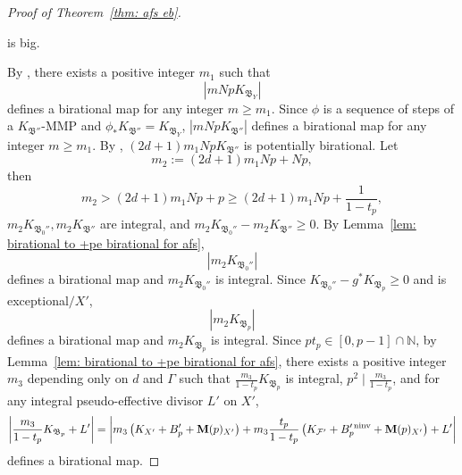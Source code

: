 \documentclass[11pt,reqno]{amsart}
\numberwithin{equation}{section}
\newcommand{\Mm}{{\bf{M}}}
\newcommand{\ninv}{\operatorname{ninv}}
\newcommand{\Bb}{{\mathfrak{B}}}
\newcommand{\Ff}{\mathcal{F}}
\newcommand{\Ii}{\Gamma}
\theoremstyle{definition}
\begin{document}
\begin{proof}[Proof of Theorem~\ref{thm: afs eb}]
\begin{enumerate}
is big.
\end{enumerate}
By \cite[Theorem~4.2]{Bir23a}, there exists a positive integer $m_1$ such that 
$$|mNpK_{\Bb_Y}|$$ defines a birational map for any integer $m\geq m_1$. Since $\phi$ is a sequence of steps of a $K_{\Bb''}$-MMP and $\phi_*K_{\Bb''}=K_{\Bb_Y}$,  $|mNpK_{\Bb''}|$ defines a birational map for any integer $m\geq m_1$. By \cite[Lemma~2.3.4]{HMX13}, $(2d+1)m_1NpK_{\Bb''}$ is potentially birational. Let
$$m_2:=(2d+1)m_1Np+Np,$$
then 
$$m_2>(2d+1)m_1Np+p\geq (2d+1)m_1Np+\frac{1}{1-t_p},$$
$m_2K_{\Bb_0''},m_2K_{\Bb''}$ are integral, and $m_2K_{\Bb_0''}-m_2K_{\Bb''}\geq 0$. By Lemma~\ref{lem: birational to +pe birational for afs},
$$|m_2K_{\Bb_0''}|$$
defines a birational map and $m_2K_{\Bb_0''}$ is integral. Since $K_{\Bb_0''}-g^*K_{\Bb_p}\geq 0$ and is exceptional$/X'$,
$$|m_2K_{\Bb_p}|$$
defines a birational map and $m_2K_{\Bb_p}$ is integral. Since $pt_p\in [0,p-1]\cap\mathbb N$, by Lemma~\ref{lem: birational to +pe birational for afs}, there exists a positive integer $m_3$ depending only on $d$ and $\Ii$ such that $\frac{m_3}{1-t_p}K_{\Bb_p}$ is integral, $p^2\mid\frac{m_3}{1-t_p}$, and for any integral pseudo-effective divisor $L'$ on $X'$, $$\left|\frac{m_3}{1-t_p}K_{\Bb_p}+L'\right|=\left|m_3\left(K_{X'}+B_p'+\Mm(p)_{X'}\right)+m_3\frac{t_p}{1-t_p}\left(K_{\Ff'}+B_p'^{\ninv}+\Mm(p)_{X'}\right)+L'\right|$$ defines a birational map. 


\end{proof}
\end{document}
